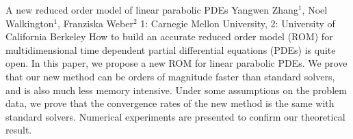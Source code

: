 \begin{addmargin}[2em]{0em}
\vspace{1.5ex}
\abs
{A new reduced order model of  linear parabolic PDEs}
{Yangwen Zhang$^{1}$, Noel Walkington$^{1}$, Franziska Weber$^{2}$}
{1: Carnegie Mellon University, 2: University of California Berkeley}
{How to build an accurate reduced order model (ROM) for  multidimensional time dependent partial differential equations (PDEs) is quite open. In this paper, we propose a new ROM for linear parabolic PDEs.  We prove that our new method can be orders of magnitude faster than
standard solvers, and is also much less memory intensive. Under some assumptions on the problem data, we prove that the convergence rates of the new method is the same with standard solvers. Numerical experiments are presented to confirm our theoretical result.}

\end{addmargin}

